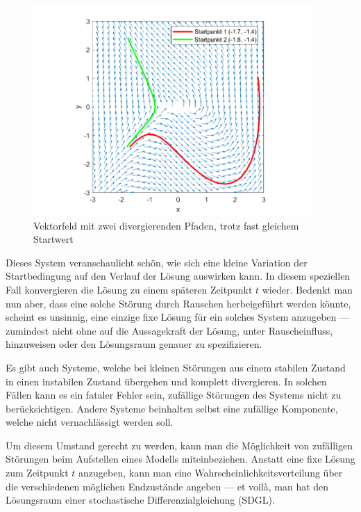 \begin{figure}
	\centering
	\includegraphics[width=0.95\textwidth]{papers/brown/images/divergentDGL.png}
	\caption{Vektorfeld mit zwei divergierenden Pfaden, trotz fast gleichem Startwert}
	\label{brown:divergentAndConvergentSystem}
\end{figure}

Dieses System veranschaulicht schön, wie sich eine kleine Variation der Startbedingung auf den Verlauf der Lösung auswirken kann. In diesem speziellen Fall konvergieren die Lösung zu einem späteren Zeitpunkt $ t $ wieder. Bedenkt man nun aber, dass eine solche Störung durch Rauschen herbeigeführt werden könnte, scheint es unsinnig, eine einzige fixe Lösung für ein solches System anzugeben --- zumindest nicht ohne auf die Aussagekraft der Lösung, unter Rauscheinfluss, hinzuweisen oder den Lösungsraum genauer zu spezifizieren.

Es gibt auch Systeme, welche bei kleinen Störungen aus einem stabilen Zustand in einen instabilen Zustand übergehen und komplett divergieren. In solchen Fällen kann es ein fataler Fehler sein, zufällige Störungen des Systems nicht zu berücksichtigen. Andere Systeme beinhalten selbst eine zufällige Komponente, welche nicht vernachlässigt werden soll.

Um diesem Umstand gerecht zu werden, kann man die Möglichkeit von zufälligen Störungen beim Aufstellen eines Modells miteinbeziehen. Anstatt eine fixe Lösung zum Zeitpunkt $ t $ anzugeben, kann man eine Wahrscheinlichkeitsverteilung über die verschiedenen möglichen Endzustände angeben --- et voilà, man hat den Lösungsraum einer stochastische Differenzialgleichung (SDGL).
